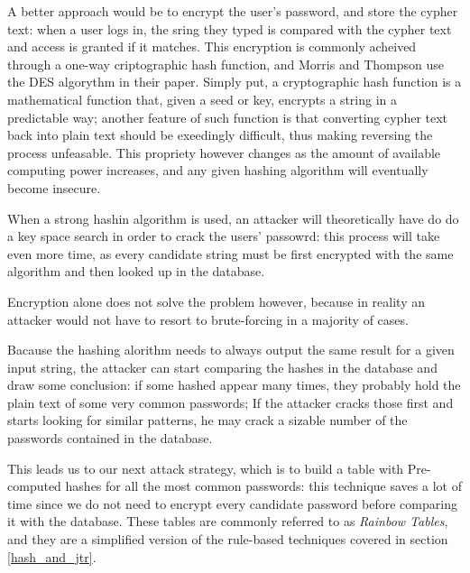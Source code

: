 A better approach would be to encrypt the user's password, and store the cypher text: when a user logs in, the sring they typed is compared with the cypher text and access is granted if it matches. This encryption is commonly acheived through a one-way criptographic hash function, and Morris and Thompson use the DES algorythm in their paper. %
Simply put, a cryptographic hash function is a mathematical function that, given a seed or key, encrypts a string in a predictable way; another feature of such function is that converting cypher text back into plain text should be exeedingly difficult, thus making reversing the process unfeasable.
This propriety however changes as the amount of available computing power increases, and any given hashing algorithm will eventually become insecure.

When a strong hashin algorithm is used, an attacker will theoretically have do do a key space search in order to crack the users' passowrd: this process will take even more time, as every candidate string must be first encrypted with the same algorithm and then looked up in the database.

Encryption alone does not solve the problem however, because in reality an attacker would not have to resort to brute-forcing in a majority of cases.

Bacause the hashing alorithm needs to always output the same result for a given input string, the attacker can start comparing the hashes in the database and draw some conclusion: if some hashed appear many times, they probably hold the plain text of some very common passwords; If the attacker cracks those first and starts looking for similar patterns, he may crack a sizable number of the passwords contained in the database.

This leads us to our next attack strategy, which is to build a table with Pre-computed hashes for all the most common passwords: this technique saves a lot of time since we do not need to encrypt every candidate password before comparing it with the database. These tables are commonly referred to as \emph{Rainbow Tables}, and they are a simplified version of the rule-based techniques covered in section \ref{hash_and_jtr}.

